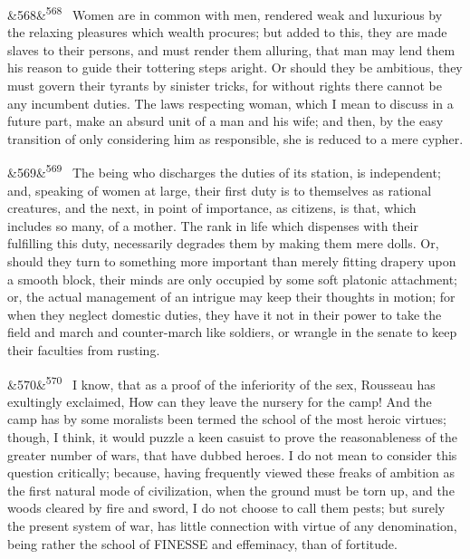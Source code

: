 \documentclass[12pt]{article}
\newcommand{\para}[1][]{\par\noindent\ifx&#1&\else\textsuperscript{\footnotesize #1}~\fi}
\begin{document}
\para[568] Women are in common with men, rendered weak and luxurious by the relaxing pleasures which wealth procures; but added to this, they are made slaves to their persons, and must render them alluring, that man may lend them his reason to guide their tottering steps aright. Or should they be ambitious, they must govern their tyrants by sinister tricks, for without rights there cannot be any incumbent duties. The laws respecting woman, which I mean to discuss in a future part, make an absurd unit of a man and his wife; and then, by the easy transition of only considering him as responsible, she is reduced to a mere cypher.

\para[569] The being who discharges the duties of its station, is independent; and, speaking of women at large, their first duty is to themselves as rational creatures, and the next, in point of importance, as citizens, is that, which includes so many, of a mother. The rank in life which dispenses with their fulfilling this duty, necessarily degrades them by making them mere dolls. Or, should they turn to something more important than merely fitting drapery upon a smooth block, their minds are only occupied by some soft platonic attachment; or, the actual management of an intrigue may keep their thoughts in motion; for when they neglect domestic duties, they have it not in their power to take the field and march and counter-march like soldiers, or wrangle in the senate to keep their faculties from rusting.

\para[570] I know, that as a proof of the inferiority of the sex, Rousseau has exultingly exclaimed, How can they leave the nursery for the camp! And the camp has by some moralists been termed the school of the most heroic virtues; though, I think, it would puzzle a keen casuist to prove the reasonableness of the greater number of wars, that have dubbed heroes. I do not mean to consider this question critically; because, having frequently viewed these freaks of ambition as the first natural mode of civilization, when the ground must be torn up, and the woods cleared by fire and sword, I do not choose to call them pests; but surely the present system of war, has little connection with virtue of any denomination, being rather the school of FINESSE and effeminacy, than of fortitude.
\end{document}

